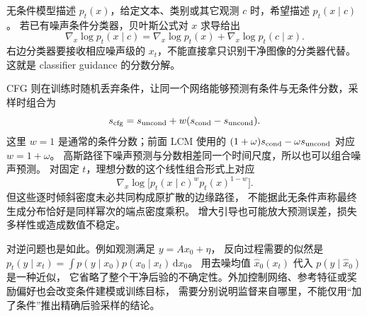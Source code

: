 无条件模型描述 $p_t(x)$，给定文本、类别或其它观测 $c$ 时，希望描述 $p_t(x\mid c)$。
若已有噪声条件分类器，贝叶斯公式对 $x$ 求导给出
\[
\nabla_x\log p_t(x\mid c)=\nabla_x\log p_t(x)+\nabla_x\log p_t(c\mid x).
\]
右边分类器要接收相应噪声级的 $x_t$，不能直接拿只识别干净图像的分类器代替。
这就是 classifier guidance 的分数分解。

CFG 则在训练时随机丢弃条件，让同一个网络能够预测有条件与无条件分数，采样时组合为
\[
s_{\rm cfg}=s_{\rm uncond}+w(s_{\rm cond}-s_{\rm uncond}).
\]
这里 $w=1$ 是通常的条件分数；前面 LCM 使用的
$(1+\omega)s_{\rm cond}-\omega s_{\rm uncond}$ 对应 $w=1+\omega$。
高斯路径下噪声预测与分数相差同一个时间尺度，所以也可以组合噪声预测。
对固定 $t$，理想分数的这个线性组合形式上对应
\[
\nabla_x\log\bigl[p_t(x\mid c)^w p_t(x)^{1-w}\bigr].
\]
但这些逐时倾斜密度未必共同构成原扩散的边缘路径，
不能据此无条件声称最终生成分布恰好是同样幂次的端点密度乘积。
增大引导也可能放大预测误差，损失多样性或造成数值不稳定。

对逆问题也是如此。例如观测满足 $y=Ax_0+\eta$，
反向过程需要的似然是
$p_t(y\mid x_t)=\int p(y\mid x_0)p(x_0\mid x_t)\,\mathrm dx_0$。
用去噪均值 $\hat x_0(x_t)$ 代入 $p(y\mid\hat x_0)$ 是一种近似，
它省略了整个干净后验的不确定性。外加控制网络、参考特征或奖励偏好也会改变条件建模或训练目标，
需要分别说明监督来自哪里，不能仅用“加了条件”推出精确后验采样的结论。
\cite{theorybook}
